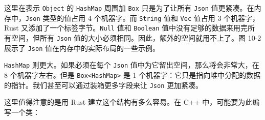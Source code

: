 这里在表示 \texttt{Object} 的 \texttt{HashMap} 周围加 \texttt{Box} 只是为了让所有 \texttt{Json} 值更紧凑。在内存中，\texttt{Json} 类型的值占用 4 个机器字。而 \texttt{String} 值和 \texttt{Vec} 值占用 3 个机器字，Rust 又添加了一个标签字节。\texttt{Null} 值和 \texttt{Boolean} 值中没有足够的数据来用完所有空间，但所有 \texttt{Json} 值的大小必须相同。因此，额外的空间就用不上了。图 10-2 展示了 \texttt{Json} 值在内存中的实际布局的一些示例。


\texttt{HashMap} 则更大。如果必须在每个 \texttt{Json} 值中为它留出空间，那么将会非常大，在 8 个机器字左右。但是 \texttt{Box<HashMap>} 是 1 个机器字：它只是指向堆中分配的数据的指针。我们甚至可以通过装箱更多字段来让 \texttt{Json} 更加紧凑。

这里值得注意的是用 Rust 建立这个结构有多么容易。在 C++ 中，可能要为此编写一个类：

